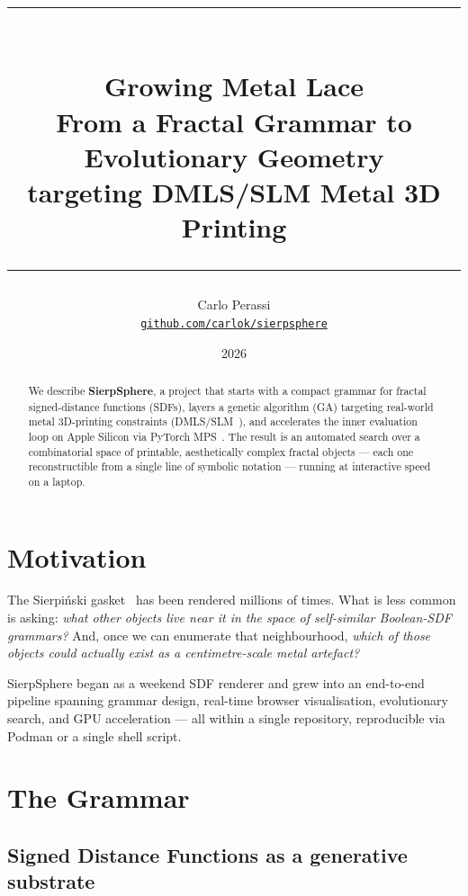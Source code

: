\documentclass[11pt, a4paper]{article}
\title{%
  {\color{accent}\rule{\linewidth}{2pt}}\\[6pt]
  \textbf{\LARGE Growing Metal Lace}\\[4pt]
  \large From a Fractal Grammar to Evolutionary Geometry\\[2pt]
  \normalsize targeting DMLS/SLM Metal 3D Printing\\[6pt]
  {\color{accent}\rule{\linewidth}{1pt}}
}
\author{Carlo Perassi\\[4pt]
  \small\href{https://github.com/carlok/sierpsphere}%
             {\texttt{github.com/carlok/sierpsphere}}}
\date{2026}
\newcommand{\term}[1]{\emph{#1}}
\begin{document}
\maketitle
\thispagestyle{empty}

\begin{abstract}
\noindent
We describe \textbf{SierpSphere}, a project that starts with a compact grammar
for fractal signed-distance functions (SDFs), layers a genetic algorithm (GA)
targeting real-world metal 3D-printing constraints
(DMLS/SLM~\cite{yap2015high}), and accelerates the inner evaluation loop on
Apple Silicon via PyTorch MPS~\cite{pytorch2019}.
The result is an automated search over a combinatorial space of printable,
aesthetically complex fractal objects — each one reconstructible from a single
line of symbolic notation — running at interactive speed on a laptop.
\end{abstract}

\vspace{1em}
{\small\tableofcontents}

\newpage

\section{Motivation}
\label{sec:motivation}

The Sierpi\'nski gasket~\cite{sierpinski1915} has been rendered millions of
times. What is less common is asking: \term{what other objects live near it in
the space of self-similar Boolean-SDF grammars?} And, once we can enumerate
that neighbourhood, \term{which of those objects could actually exist as a
centimetre-scale metal artefact?}

SierpSphere began as a weekend SDF renderer and grew into an end-to-end
pipeline spanning grammar design, real-time browser visualisation,
evolutionary search, and GPU acceleration — all within a single repository,
reproducible via Podman or a single shell script.

\section{The Grammar}
\label{sec:grammar}

\subsection{Signed Distance Functions as a generative substrate}
\label{subsec:sdf}
\end{document}
